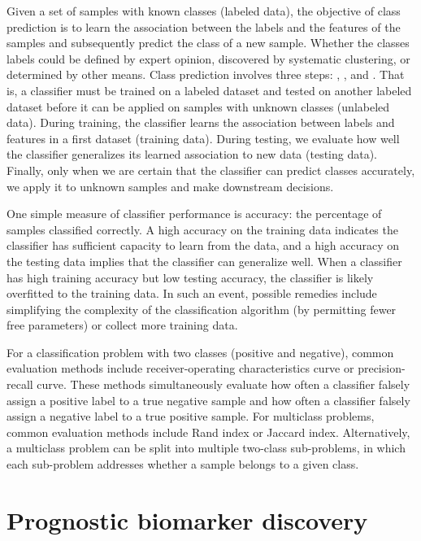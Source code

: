 Given a set of samples with known classes (labeled data), the objective of class prediction is to learn the association between the labels and the features of the samples and subsequently predict the class of a new sample. Whether the classes labels could be defined by expert opinion, discovered by systematic clustering, or determined by other means. Class prediction involves three steps: , , and . That is, a classifier must be trained on a labeled dataset and tested on another labeled dataset before it can be applied on samples with unknown classes (unlabeled data). During training, the classifier learns the association between labels and features in a first dataset (training data). During testing, we evaluate how well the classifier generalizes its learned association to new data (testing data). Finally, only when we are certain that the classifier can predict classes accurately, we apply it to unknown samples and make downstream decisions.

One simple measure of classifier performance is accuracy: the percentage of samples classified correctly. A high accuracy on the training data indicates the classifier has sufficient capacity to learn from the data, and a high accuracy on the testing data implies that the classifier can generalize well. When a classifier has high training accuracy but low testing accuracy, the classifier is likely overfitted to the training data. In such an event, possible remedies include simplifying the complexity of the classification algorithm (by permitting fewer free parameters) or collect more training data.

For a classification problem with two classes (positive and negative), common evaluation methods include receiver-operating characteristics curve or precision-recall curve. These methods simultaneously evaluate how often a classifier falsely assign a positive label to a true negative sample and how often a classifier falsely assign a negative label to a true positive sample. For multiclass problems, common evaluation methods include Rand index or Jaccard index. Alternatively, a multiclass problem can be split into multiple two-class sub-problems, in which each sub-problem addresses whether a sample belongs to a given class.


\section{Prognostic biomarker discovery}
\label{sec:prognostication}

